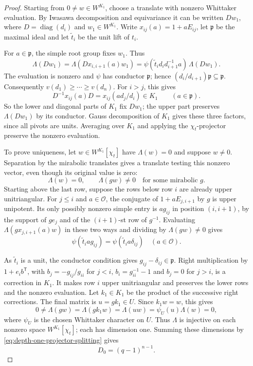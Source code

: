 \begin{proof}
Starting from \(0\ne w\in W^{K_1}\), choose a
translate with nonzero Whittaker evaluation. By
Iwasawa decomposition and equivariance it can be
written \(D w_1\), where \(D=\operatorname{diag}(d_i)\)
and \(w_1\in W^{K_1}\). Write \(x_{ij}(a)=1+aE_{ij}\), let \(\mathfrak p\) be the
maximal ideal and let \(\widetilde t_i\) be the unit lift of \(t_i\).

For \(a\in\mathfrak p\), the simple root group fixes \(w_1\). Thus
\[
 \Lambda(Dw_1)
 =\Lambda(Dx_{i,i+1}(a)w_1)
 =\psi(\widetilde t_i d_i d_{i+1}^{-1}a)\,\Lambda(Dw_1).
\]
The evaluation is nonzero and \(\psi\) has conductor \(\mathfrak p\);
hence \((d_i/d_{i+1})\mathfrak p\subseteq\mathfrak p\).
Consequently \(v(d_1)\ge\cdots\ge v(d_n)\). For \(i>j\), this gives
\[
 D^{-1}x_{ij}(a)D=x_{ij}(a d_j/d_i)\in K_1
       \qquad(a\in\mathfrak p).
\]
So the lower and diagonal parts of \(K_1\) fix \(Dw_1\);
the upper part preserves \(\Lambda(Dw_1)\) by its conductor. Gauss decomposition of
\(K_1\) gives these three factors, since all pivots
are units. Averaging over \(K_1\) and applying the
\(\chi_t\)-projector preserve the nonzero evaluation.

To prove uniqueness, let \(w\in W^{K_1}[\chi_t]\)
have \(\Lambda(w)=0\) and suppose \(w\ne0\).
Separation by the mirabolic translates gives a translate testing this nonzero vector, even though its original value is zero:
\[
 \Lambda(w)=0,\qquad \Lambda(gw)\ne0\quad\text{for some mirabolic }g.
\] Starting above the last row,
suppose the rows below row \(i\) are already upper
unitriangular. For \(j\le i\) and \(a\in\mathcal O\),
the conjugate of \(1+aE_{j,i+1}\) by \(g\) is upper
unipotent. Its only possibly nonzero simple entry
is \(ag_{ij}\) in position \((i,i+1)\), by the
support of \(ge_j\) and of the \((i+1)\)-st row of
\(g^{-1}\). Evaluating \(\Lambda(g x_{j,i+1}(a)w)\) in these two ways and dividing by
\(\Lambda(gw)\ne0\) gives
\[
 \psi(\widetilde t_i a g_{ij})
     =\psi(\widetilde t_i a\delta_{ij})\quad(a\in\mathcal O).
\]

As \(\widetilde t_i\) is a unit, the conductor condition gives
\(g_{ij}-\delta_{ij}\in\mathfrak p\).
Right multiplication by \(1+e_i b^{\mathsf T}\),
with \(b_j=-g_{ij}/g_{ii}\) for \(j<i\),
\(b_i=g_{ii}^{-1}-1\) and \(b_j=0\) for \(j>i\),
is a correction in \(K_1\). It makes row \(i\)
upper unitriangular and preserves the lower rows
and the nonzero evaluation. Let \(k_1\in K_1\) be the product of the successive right corrections.
The final matrix is \(u=gk_1\in U\). Since \(k_1 w=w\), this gives
\[
 0\ne\Lambda(gw)=\Lambda(gk_1w)=\Lambda(uw)
                   =\psi_U(u)\Lambda(w)=0,
\]
where \(\psi_U\) is the chosen Whittaker character on \(U\).
Thus \(\Lambda\) is injective on each nonzero space
\(W^{K_1}[\chi_t]\); each has dimension one.
Summing these dimensions by \eqref{eq:depth-one-projector-splitting} gives
\[
                         D_0=(q-1)^{n-1}.
\]


\end{proof}
